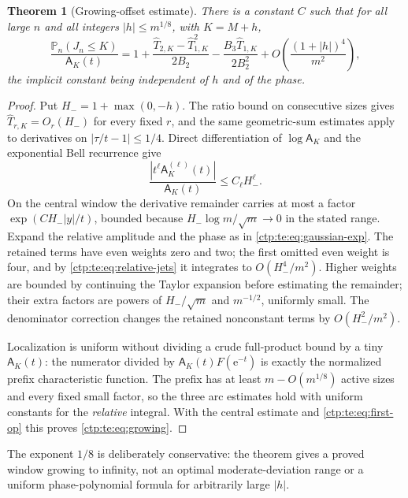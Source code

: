 \documentclass[11pt,a4paper]{article}
\numberwithin{equation}{section}
\newtheorem{theorem}{Theorem}[section]
\theoremstyle{definition}
\theoremstyle{remark}
\newcommand{\e}{\mathrm e}
\newcommand{\PP}{\mathbb P}
\newcommand{\amp}{\mathsf A}
\begin{document}
\begin{theorem}[Growing-offset estimate]\label{ctp:te:thm:growing}
There is a constant $C$ such that for all large $n$ and all integers
$|h|\le m^{1/8}$, with $K=M+h$,
\begin{equation}\label{ctp:te:eq:growing}
 \frac{\PP_n(J_n\le K)}{\amp_K(t)}=1+\frac{\widehat T_{2,K}-\widehat T_{1,K}^2}{2B_2}
 -\frac{B_3\widehat T_{1,K}}{2B_2^2}+O\!\left(\frac{(1+|h|)^4}{m^2}\right),
\end{equation}
the implicit constant being independent of $h$ and of the phase.
\end{theorem}
\begin{proof}
Put $H_-=1+\max(0,-h)$. The ratio bound on consecutive sizes gives
$\widehat T_{r,K}=O_r(H_-)$ for every fixed $r$, and the same geometric-sum
estimates apply to derivatives on $|\tau/t-1|\le1/4$. Direct
differentiation of $\log\amp_K$ and the exponential Bell recurrence give
\begin{equation}\label{ctp:te:eq:relative-jets}
 \frac{|t^\ell\amp_K^{(\ell)}(t)|}{\amp_K(t)}\le C_\ell H_-^\ell.
\end{equation}
On the central window the derivative remainder carries at most a factor
$\exp(CH_-|y|/t)$, bounded because $H_-\log m/\sqrt m\to0$ in the stated
range. Expand the relative amplitude and the phase as in
\eqref{ctp:te:eq:gaussian-exp}. The retained terms have even weights zero
and two; the first omitted even weight is four, and by
\eqref{ctp:te:eq:relative-jets} it integrates to $O(H_-^4/m^2)$. Higher
weights are bounded by continuing the Taylor expansion before estimating the
remainder; their extra factors are powers of $H_-/\sqrt m$ and $m^{-1/2}$,
uniformly small. The denominator correction changes the retained
nonconstant terms by $O(H_-^2/m^2)$.

Localization is uniform without dividing a crude full-product bound by a
tiny $\amp_K(t)$: the numerator divided by $\amp_K(t)F(\e^{-t})$ is exactly
the normalized prefix characteristic function. The prefix has at least
$m-O(m^{1/8})$ active sizes and every fixed small factor, so the three arc
estimates hold with uniform constants for the \emph{relative} integral.
With the central estimate and \eqref{ctp:te:eq:first-op} this proves
\eqref{ctp:te:eq:growing}.
\end{proof}

The exponent $1/8$ is deliberately conservative: the theorem gives a proved
window growing to infinity, not an optimal moderate-deviation range or a
uniform phase-polynomial formula for arbitrarily large $|h|$.
\end{document}
